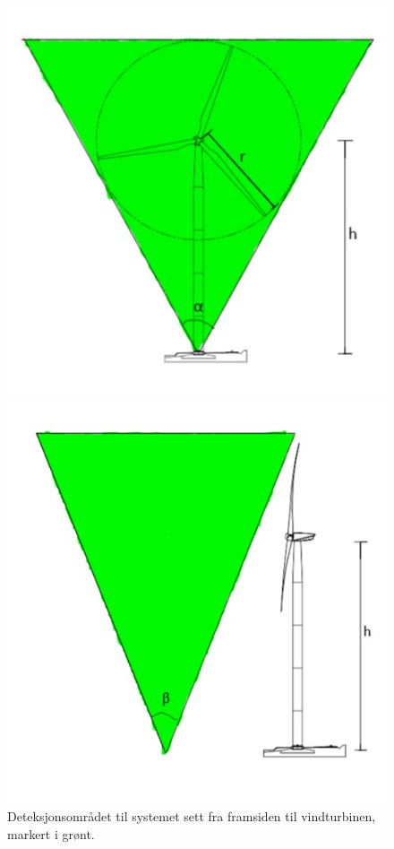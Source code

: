 \begin{figure}[H]%
  \centering
  \begin{minipage}[b]{0.45\textwidth}
    \includegraphics[width=\textwidth]{design/DeteksjonForan.jpg}
    \caption{Deteksjonsområdet til systemet sett fra framsiden til vindturbinen, markert i grønt. }
    \label{fig:TurbinForan}
  \end{minipage}
  \hfill
  \begin{minipage}[b]{0.45\textwidth}
    \includegraphics[width=\textwidth]{design/DeteksjonSiden.jpg}

\end{minipage}
\end{figure}
